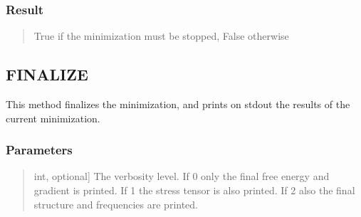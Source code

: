 \documentclass[a4paper,11pt,english]{sphinxmanual}
\begin{document}
\begin{fulllineitems}
\begin{fulllineitems}
\subsubsection{Result}
\label{\detokenize{apireference:result}}\begin{quote}
\begin{description}
\sphinxAtStartPar
True if the minimization must be stopped, False otherwise

\end{description}
\end{quote}

\end{fulllineitems}


\begin{fulllineitems}
\label{\detokenize{apireference:sscha.SchaMinimizer.SSCHA_Minimizer.finalize}}
\pysigstartsignatures
{}
\pysigstopsignatures

\subsection{FINALIZE}
\label{\detokenize{apireference:finalize}}
\sphinxAtStartPar
This method finalizes the minimization, and prints on stdout the
results of the current minimization.


\subsubsection{Parameters}
\label{\detokenize{apireference:id30}}\begin{quote}
\begin{description}
\sphinxlineitem{verbose}{[}int, optional{]}
\sphinxAtStartPar
The verbosity level. If 0 only the final free energy and gradient is printed.
If 1 the stress tensor is also printed. If 2 also the final structure and frequencies
are printed.

\end{description}
\end{quote}

\end{fulllineitems}



\end{fulllineitems}
\end{document}
